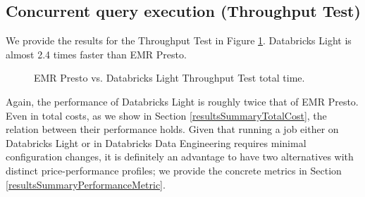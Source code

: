 \subsection{Concurrent query execution (Throughput Test)}

We provide the results for the Throughput Test in Figure \ref{fig:prestoVsDatabricksLightTputTest}. Databricks Light is almost 2.4 times faster than EMR Presto.

\begin{figure}
   \begin{center}
   \end{center}
   \caption{EMR Presto vs. Databricks Light Throughput Test total time.}
   \label{fig:prestoVsDatabricksLightTputTest}
\end{figure}

Again, the performance of Databricks Light is roughly twice that of EMR Presto. Even in total costs, as we show in Section \ref{resultsSummaryTotalCost}, the relation between their performance holds. Given that running a job either on Databricks Light or in Databricks Data Engineering requires minimal configuration changes, it is definitely an advantage to have two alternatives with distinct price-performance profiles; we provide the concrete metrics in Section \ref{resultsSummaryPerformanceMetric}.



